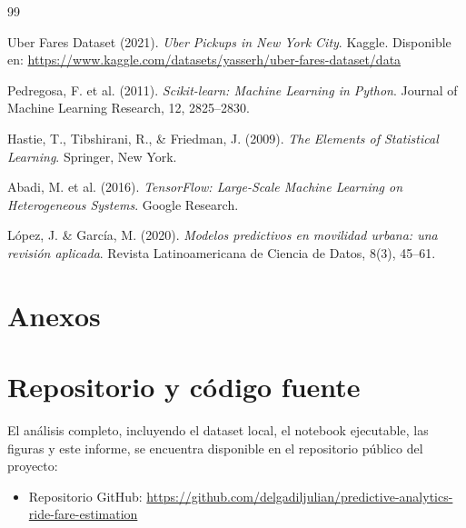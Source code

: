 \documentclass[10pt]{article}
\begin{document}
	\begin{thebibliography}{99}

		Uber Fares Dataset (2021). \textit{Uber Pickups in New York City}. Kaggle. Disponible en: \url{https://www.kaggle.com/datasets/yasserh/uber-fares-dataset/data}

		Pedregosa, F. et al. (2011). \textit{Scikit-learn: Machine Learning in Python}. Journal of Machine Learning Research, 12, 2825–2830.

		Hastie, T., Tibshirani, R., \& Friedman, J. (2009). \textit{The Elements of Statistical Learning}. Springer, New York.

		Abadi, M. et al. (2016). \textit{TensorFlow: Large-Scale Machine Learning on Heterogeneous Systems}. Google Research.

		López, J. \& García, M. (2020). \textit{Modelos predictivos en movilidad urbana: una revisión aplicada}. Revista Latinoamericana de Ciencia de Datos, 8(3), 45–61.

	\end{thebibliography}

	\appendix
	\section*{Anexos}

	\section{Repositorio y código fuente}
	El análisis completo, incluyendo el dataset local, el notebook ejecutable, las figuras y este informe, se encuentra disponible en el repositorio público del proyecto:

	\begin{itemize}
		\item Repositorio GitHub: \url{https://github.com/delgadiljulian/predictive-analytics-ride-fare-estimation}
	\end{itemize}
\end{document}
